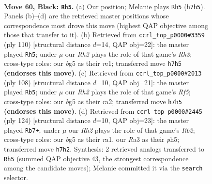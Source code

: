 \documentclass[11pt]{article}
\begin{document}
\clearpage

\begin{figure}[p]\centering
\begin{subfigure}{0.46\textwidth}\centering
\resizebox{\linewidth}{!}{%
\newchessgame
\chessboard[
  setfen={8/3k3r/3P4/1p4B1/3K4/r7/1p6/8 b - - 3 60},
  showmover=false,
  pgfstyle=straightmove, color=movearrow, markmove={h7-h5}
]}
\caption{}
\end{subfigure}\hfill
\begin{subfigure}{0.46\textwidth}\centering
\resizebox{\linewidth}{!}{%
\newchessgame
\chessboard[
  setfen={8/2k5/8/8/8/1PpK3R/8/4r3 w - - 12 56},
  showmover=false,
  pgfstyle=straightmove, color=movearrow, markmove={h3-h5}
]}
\caption{}
\end{subfigure}
\\[4pt]
\begin{subfigure}{0.46\textwidth}\centering
\resizebox{\linewidth}{!}{%
\newchessgame
\chessboard[
  setfen={8/8/7p/5R1K/8/4k1P1/r7/8 w - - 4 55},
  showmover=false,
  pgfstyle=straightmove, color=movearrow, markmove={f5-b5}
]}
\caption{}
\end{subfigure}\hfill
\begin{subfigure}{0.46\textwidth}\centering
\resizebox{\linewidth}{!}{%
\newchessgame
\chessboard[
  setfen={8/6k1/8/7p/7P/5p2/1R3K2/r7 w - - 0 63},
  showmover=false,
  pgfstyle=straightmove, color=movearrow, markmove={b2-b7}
]}
\caption{}
\end{subfigure}
\caption{\textbf{Move 60, Black: \texttt{Rh5}.} (a) Our position; Melanie plays \texttt{Rh5} (\texttt{h7h5}). Panels (b)--(d) are the retrieved master positions whose correspondence most drove this move (highest QAP objective among those that transfer to it). (b) Retrieved from \texttt{ccrl\_top\_p0000\#3359} (ply 110) [structural distance $d$=14, QAP obj=22]: the master played \texttt{Rh5}; under $\mu$ our \emph{Rh2} plays the role of that game's \emph{Rh3}; cross-type roles: our \emph{b}g5 as their \emph{r}e1; transferred move \texttt{h7h5} \textbf{(endorses this move)}. (c) Retrieved from \texttt{ccrl\_top\_p0000\#2013} (ply 108) [structural distance $d$=10, QAP obj=21]: the master played \texttt{Rb5}; under $\mu$ our \emph{Rh2} plays the role of that game's \emph{Rf5}; cross-type roles: our \emph{b}g5 as their \emph{r}a2; transferred move \texttt{h7h5} \textbf{(endorses this move)}. (d) Retrieved from \texttt{ccrl\_top\_p0000\#2445} (ply 124) [structural distance $d$=10, QAP obj=23]: the master played \texttt{Rb7+}; under $\mu$ our \emph{Rh2} plays the role of that game's \emph{Rb2}; cross-type roles: our \emph{b}g5 as their \emph{r}a1, our \emph{R}a3 as their \emph{p}h5; transferred move \texttt{h7h2}. Synthesis: 2 retrieved analogs transferred to \texttt{Rh5} (summed QAP objective 43, the strongest correspondence among the candidate moves); Melanie committed it via the \texttt{search} selector.}
\label{fig:thought-m119}
\end{figure}
\end{document}

